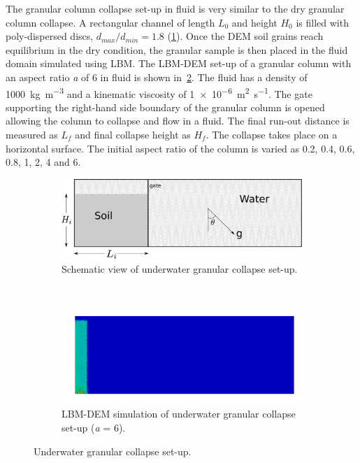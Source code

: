 The granular column collapse set-up in fluid is very similar to the dry 
granular column collapse. A rectangular channel of length $L_0$ and height 
$H_0$ is filled with poly-dispersed discs, $d_{max}/d_{min} = 1.8$  
(\cref{fig:geometry}). Once the DEM soil grains reach equilibrium in the dry 
condition, the granular sample is then placed in the fluid domain simulated 
using LBM. The LBM-DEM set-up of a granular column with an aspect ratio 
\textit{a} of 6 in fluid is shown in~\cref{fig:LBMgeometry}. The fluid has a 
density of 
\SI{1000}{\kg\per\cubic\meter}  and a kinematic viscosity of 
\SI{1e-6}{\square\meter\per\second}. The gate supporting the right-hand 
side 
boundary of the granular column is opened allowing the column to collapse and 
flow in a fluid. The final run-out distance is measured as $L_f$ and 
final collapse height as $H_f$. The collapse takes place on a horizontal 
surface. The initial aspect ratio of the column is varied as 0.2, 0.4, 0.6, 
0.8, 1, 2, 4 and 6. 

\begin{figure}[htpb]
\centering
\begin{subfigure}[b]{0.975\textwidth}
\centering
\includegraphics[width=\columnwidth]{geometry}
\caption{Schematic view of underwater granular collapse set-up.}
\label{fig:geometry}
\end{subfigure} \\

\begin{subfigure}[b]{0.975\textwidth}
\centering
\includegraphics[width=\columnwidth]{a6/ini_a6_geom}
\caption{LBM-DEM simulation of underwater granular collapse set-up (\textit{a} 
= 6).}
\label{fig:LBMgeometry}
\end{subfigure}
\caption{Underwater granular collapse set-up.}
\label{fig:LBM_Scheme_geometry}
\end{figure}



